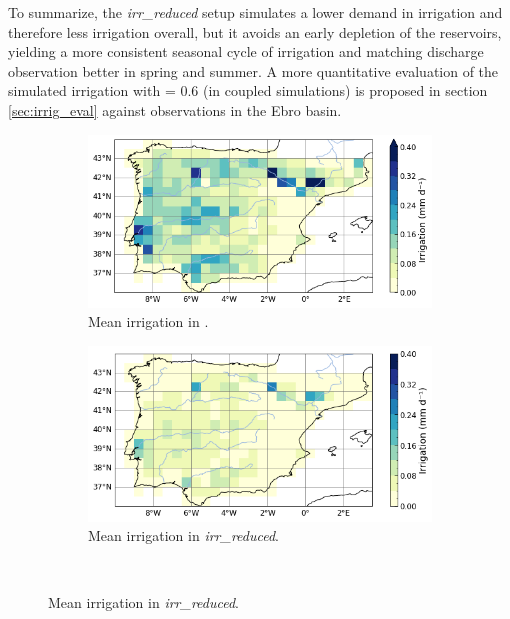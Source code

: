 To summarize, the \textit{irr\_reduced} setup simulates a lower demand in irrigation and therefore less irrigation overall, but it avoids an early depletion of the reservoirs, yielding a more consistent seasonal cycle of irrigation and matching discharge observation better in spring and summer. A more quantitative evaluation of the simulated irrigation with \betairrig = 0.6 (in coupled simulations) is proposed in section \ref{sec:irrig_eval} against observations in the Ebro basin.

\begin{figure}[htbp]
    \centering
    \begin{subfigure}[b]{0.48\textwidth}
        \caption{Mean irrigation in \irr.\\ } 
        \includegraphics[width=\textwidth]{images/chap3/maps/irrigation_ave_tcst4_irr.png}
    \end{subfigure}
    \begin{subfigure}[b]{0.48\textwidth}
        \caption{Mean irrigation in \textit{irr\_reduced}.} 
        \includegraphics[width=\textwidth]{images/chap3/maps/irrigation_ave_tcst4_irr_reduced.png}
    \end{subfigure} \\


\end{figure}
